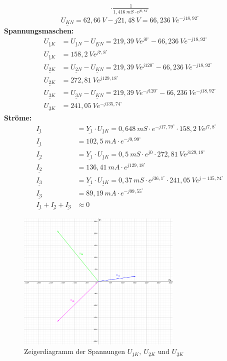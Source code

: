 \begin{enumerate}[label=\alph*)]
\begin{multline*}
                      \cdot\frac{1}{1,416\ mS\cdot e^{j0,81^\circ}}
    \end{multline*}
    $$\underline{U_{KN}}=62,66\ V-j21,48\ V=66,236\ V e^{-j18,92^\circ}$$
  \textbf{Spannungsmaschen:}
  \begin{align*}
    \underline{U_{1K}} &= \underline{U_{1N}} - \underline{U_{KN}} = 219,39\ Ve^{j0^\circ} - 66,236\ Ve^{-j18,92^\circ}\\
    \underline{U_{1K}} &= 158,2\ Ve^{j7,8^\circ}\\
    \underline{U_{2K}} &= \underline{U_{2N}} - \underline{U_{KN}} = 219,39\ Ve^{j120^\circ} - 66,236\ Ve^{-j18,92^\circ}\\
    \underline{U_{2K}} &= 272,81\ Ve^{j129,18^\circ}\\
    \underline{U_{3K}} &= \underline{U_{3N}} - \underline{U_{KN}} = 219,39\ Ve^{-j120^\circ} - 66,236\ Ve^{-j18,92^\circ}\\
    \underline{U_{3K}} &= 241,05\ Ve^{-j135,74^\circ}
  \end{align*}
  \textbf{Ströme:}
  \begin{align*}
    \underline{I_1} &= \underline{Y_1}\cdot\underline{U_{1K}} = 0,648\ mS\cdot e^{-j17,79^\circ}\cdot 158,2\ Ve^{j7,8^\circ}\\
    \underline{I_1} &= 102,5\ mA \cdot e^{-j9,99^\circ}\\
    \underline{I_2} &= \underline{Y_1}\cdot\underline{U_{1K}} = 0,5\ mS\cdot e^{j0}\cdot 272,81\ Ve^{j129,18^\circ}\\
    \underline{I_2} &= 136,41\ mA\cdot e^{j129,18^\circ}\\
    \underline{I_3} &= \underline{Y_1}\cdot\underline{U_{1K}} = 0,37\ mS\cdot e^{j36,1^\circ}\cdot 241,05\ Ve^{j-135,74^\circ}\\
    \underline{I_3} &= 89,19\ mA\cdot e^{-j99,55^\circ}\\
    \underline{I_1} +\underline{I_2} + \underline{I_3} &\approx 0
  \end{align*}
\begin{figure}[h!]
  \begin{center}
    \includegraphics[width=0.70\textwidth]{img/img2.6.2.png}
  \end{center}
  \caption{Zeigerdiagramm der Spannungen $\underline{U_{1K}},\ \underline{U_{2K}} \text{ und } \underline{U_{3K}}$}
\end{figure}


\end{enumerate}
